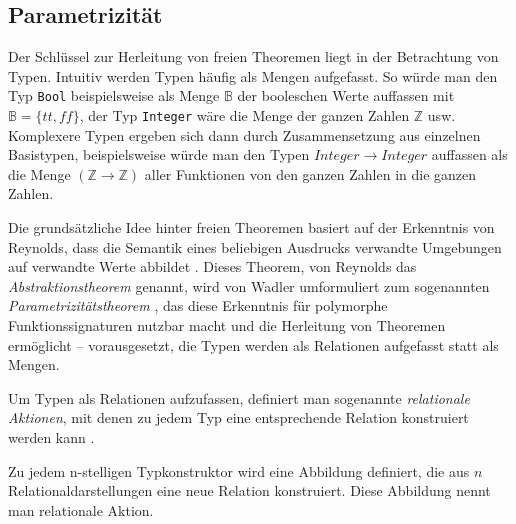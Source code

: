 \subsection{Parametrizität}

\label{sec:free-theorems-param}

Der Schlüssel zur Herleitung von freien Theoremen liegt in der Betrachtung von Typen.
Intuitiv werden Typen häufig als Mengen aufgefasst. So würde man den Typ \texttt{Bool} beispielsweise als Menge $\mathbb{B}$
der booleschen Werte auffassen mit $\mathbb{B} = \{ tt, ff \}$, der Typ \texttt{Integer} wäre die Menge der ganzen Zahlen
$\mathbb{Z}$ usw. Komplexere Typen ergeben sich dann durch Zusammensetzung aus einzelnen Basistypen, beispielsweise
würde man den Typen \texttt{$Integer \rightarrow Integer$} auffassen als die Menge $(\mathbb{Z} \rightarrow \mathbb{Z})$ aller Funktionen von den ganzen Zahlen in die ganzen Zahlen.

Die grundsätzliche Idee hinter freien Theoremen basiert auf der Erkenntnis von Reynolds, dass die Semantik eines beliebigen
Ausdrucks verwandte Umgebungen auf verwandte Werte abbildet \cite{reynolds}. Dieses Theorem, von Reynolds das
\textit{Abstraktionstheorem} genannt, wird von Wadler umformuliert zum sogenannten \textit{Parametrizitätstheorem} \cite{wadler},
das diese Erkenntnis für polymorphe Funktionssignaturen nutzbar macht und die Herleitung von Theoremen ermöglicht --
vorausgesetzt, die Typen werden als Relationen aufgefasst statt als Mengen.

Um Typen als Relationen aufzufassen, definiert man sogenannte \textit{relationale Aktionen}, mit denen zu jedem Typ eine entsprechende Relation
konstruiert werden kann \cite{johann2006}.

\begin{mydef}
Zu jedem n-stelligen Typkonstruktor wird eine Abbildung definiert, die aus $n$ Relationaldarstellungen eine neue Relation konstruiert.
Diese Abbildung nennt man relationale Aktion.
\end{mydef}


